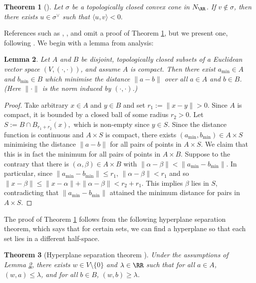 \documentclass[12pt]{amsart}
\theoremstyle{plain}
\newtheorem{theorem}{Theorem}[subsection]
\newtheorem{lemma}[theorem]{Lemma}
\begin{document}
\begin{theorem}[{\cite[\S 1.2]{Fulton93}}]\label{theorem:dualcone}
Let $\sigma$ be a topologically closed convex cone in $N_\RR$.
If $v \notin \sigma$, then there exists $u \in \sigma^\vee$ such that $\langle u, v \rangle <0.$
\end{theorem}

References such as \cite{Fulton93}, \cite{CLS11}, and \cite{Oda88} omit a proof of Theorem \ref{theorem:dualcone}, but we present one, following \cite{BV04}.
We begin with a lemma from analysis:

\begin{lemma}\label{lemma:mindistance}
Let $A$ and $B$ be disjoint, topologically closed subsets of a Euclidean vector space $(V, (\cdot,\cdot))$, and assume $A$ is compact.
Then there exist $a_{\text{min}} \in A$ and $b_{\text{min}} \in B$ which minimise the distance $\|a-b\|$ over all $a \in A$ and $b \in B$.
(Here $\|\cdot\|$ is the norm induced by $(\cdot,\cdot)$.)
\end{lemma}
\begin{proof}
Take arbitrary $x \in A$ and $y \in B$ and set $r_1 := \|x-y\| > 0$.
Since $A$ is compact, it is bounded by a closed ball of some radius $r_2 > 0$.
Let $S := B \cap \overline{B_{r_1+r_2}(x)},$ which is non-empty since $y \in S$.
Since the distance function is continuous and $A \times S$ is compact, there exists $(a_{\text{min}}, b_{\text{min}}) \in A \times S$ minimising the distance $\|a - b\|$ for all pairs of points in $A \times S$.
We claim that this is in fact the minimum for all pairs of points in $A \times B$.
Suppose to the contrary that there is $(\alpha,\beta) \in A \times B$ with $\|\alpha - \beta\| < \|a_{\text{min}} - b_{\text{min}}\|$. 
In particular, since $\|a_{\text{min}} - b_{\text{min}}\|\le r_1$, $\|\alpha - \beta\| < r_1$ and so
$\|x - \beta\| \le \|x- \alpha\| + \|\alpha - \beta\| < r_2 + r_1.$
This implies $\beta$ lies in $S$, contradicting that $\|a_{\text{min}} - b_{\text{min}}\|$ attained the minimum distance for pairs in $A \times S$.
\end{proof}

The proof of Theorem \ref{theorem:dualcone} follows from the following hyperplane separation theorem, which says that for certain sets, we can find a hyperplane so that each set lies in a different half-space.

\begin{theorem}[Hyperplane separation theorem {\cite[\S 2.5.1]{BV04}}]\label{hyperplaneseparation}
Under the assumptions of Lemma \ref{lemma:mindistance}, there exists $w \in V\setminus\{0\}$ and $\lambda \in \RR$ such that for all $a \in A$, $(w, a) \le \lambda$, and for all $b \in B$, $(w, b) \ge \lambda$.
\end{theorem}
\end{document}
